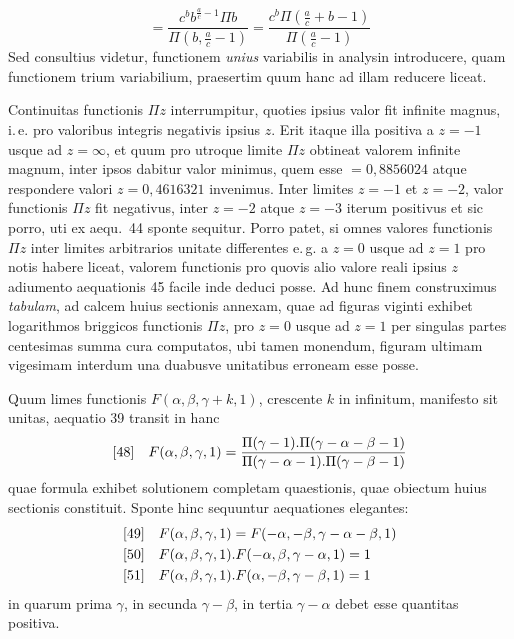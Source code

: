 \[
=\frac{c^b b^{\frac{a}{c}-1}\Pi b}{\Pi(b,\frac{a}{c}-1)}
=\frac{c^b\Pi(\frac{a}{c}+b-1)}{\Pi(\frac{a}{c}-1)}
\]
Sed consultius videtur, functionem \emph{unius} variabilis in analysin
introducere, quam functionem trium variabilium, praesertim quum hanc
ad illam reducere liceat.

Continuitas functionis $\Pi z$ interrumpitur, quoties ipsius valor fit
infinite magnus, i.\,e. pro valoribus integris negativis ipsius $z$.
Erit itaque illa positiva a $z=-1$ usque ad $z=\infty$, et quum pro
utroque limite $\Pi z$ obtineat valorem infinite magnum, inter ipsos
dabitur valor minimus, quem esse $=0{,}8856024$ atque respondere valori
$z=0{,}4616321$ invenimus. Inter limites $z=-1$ et $z=-2$, valor
functionis $\Pi z$ fit negativus, inter $z=-2$ atque $z=-3$ iterum
positivus et sic porro, uti ex aequ.\ 44 sponte sequitur. Porro patet,
si omnes valores functionis $\Pi z$ inter limites arbitrarios unitate
differentes e.\,g. a $z=0$ usque ad $z=1$ pro notis habere liceat,
valorem functionis pro quovis alio valore reali ipsius $z$ adiumento
aequationis 45 facile inde deduci posse. Ad hunc finem construximus
\emph{tabulam}, ad calcem huius sectionis annexam, quae ad figuras
viginti exhibet logarithmos briggicos functionis $\Pi z$, pro $z=0$
usque ad $z=1$ per singulas partes centesimas summa cura computatos,
ubi tamen monendum, figuram ultimam vigesimam interdum una duabusve
unitatibus erroneam esse posse.

Quum limes functionis $F(\alpha,\beta,\gamma+k,1)$, crescente $k$ in
infinitum, manifesto sit unitas, aequatio 39 transit in hanc
\[
\begin{array}{@{}ll@{}}
[48]&\displaystyle F(\alpha,\beta,\gamma,1)=
\frac{\Pi(\gamma-1).\Pi(\gamma-\alpha-\beta-1)}
{\Pi(\gamma-\alpha-1).\Pi(\gamma-\beta-1)}
\end{array}
\]
quae formula exhibet solutionem completam quaestionis, quae obiectum
huius sectionis constituit. Sponte hinc sequuntur aequationes elegantes:
\[
\begin{array}{@{}ll@{}}
[49]&\displaystyle F(\alpha,\beta,\gamma,1)=F(-\alpha,-\beta,\gamma-\alpha-\beta,1)\\[3pt]
[50]&\displaystyle F(\alpha,\beta,\gamma,1).F(-\alpha,\beta,\gamma-\alpha,1)=1\\[3pt]
[51]&\displaystyle F(\alpha,\beta,\gamma,1).F(\alpha,-\beta,\gamma-\beta,1)=1
\end{array}
\]
in quarum prima $\gamma$, in secunda $\gamma-\beta$, in tertia
$\gamma-\alpha$ debet esse quantitas positiva.

